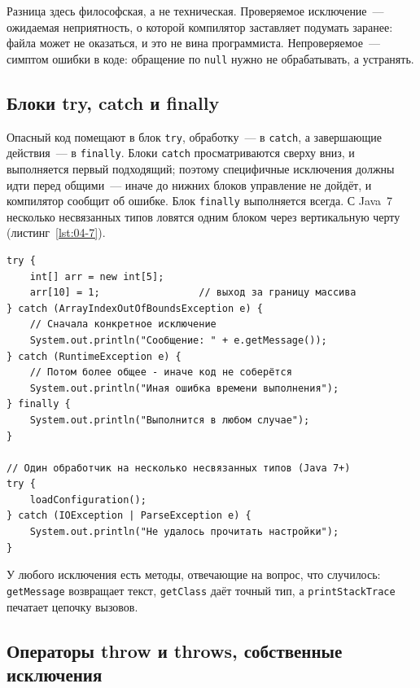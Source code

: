 Разница здесь философская, а не техническая. Проверяемое исключение~---
ожидаемая неприятность, о которой компилятор заставляет подумать заранее: файла
может не оказаться, и это не вина программиста. Непроверяемое~--- симптом
ошибки в коде: обращение по \texttt{null} нужно не обрабатывать, а устранять.

\subsection{Блоки try, catch и finally}

Опасный код помещают в блок \texttt{try}, обработку~--- в \texttt{catch}, а
завершающие действия~--- в \texttt{finally}. Блоки \texttt{catch}
просматриваются сверху вниз, и выполняется первый подходящий; поэтому
специфичные исключения должны идти перед общими~--- иначе до нижних блоков
управление не дойдёт, и компилятор сообщит об ошибке. Блок \texttt{finally}
выполняется всегда. С Java~7 несколько несвязанных типов ловятся одним блоком
через вертикальную черту (листинг~\ref{lst:04-7}).

\begin{listing}[H]
\begin{verbatim}
try {
    int[] arr = new int[5];
    arr[10] = 1;                 // выход за границу массива
} catch (ArrayIndexOutOfBoundsException e) {
    // Сначала конкретное исключение
    System.out.println("Сообщение: " + e.getMessage());
} catch (RuntimeException e) {
    // Потом более общее - иначе код не соберётся
    System.out.println("Иная ошибка времени выполнения");
} finally {
    System.out.println("Выполнится в любом случае");
}

// Один обработчик на несколько несвязанных типов (Java 7+)
try {
    loadConfiguration();
} catch (IOException | ParseException e) {
    System.out.println("Не удалось прочитать настройки");
}
\end{verbatim}
\caption{Порядок блоков catch и multi-catch}
\label{lst:04-7}
\end{listing}

У любого исключения есть методы, отвечающие на вопрос, что случилось:
\texttt{getMessage} возвращает текст, \texttt{getClass} даёт точный тип, а
\texttt{printStackTrace} печатает цепочку вызовов.

\subsection{Операторы throw и throws, собственные исключения}

